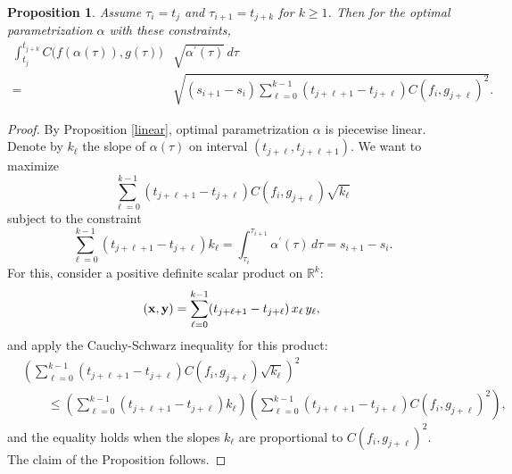 \documentclass[10pt,a4paper]{amsart}
\newcommand\R{\mathbb R}
\newtheorem{proposition}{Proposition}
\begin{document}
\begin{proposition}
\label{caseB}
Assume $\tau_i = t_j$ and $\tau_{i+1} = t_{j+k}$ for $k \geq 1$. Then for the optimal parametrization $\alpha$ with these constraints,
\begin{align*}
\int_{t_j}^{t_{j+k}}  C\big(f(\alpha(\tau)), g(\tau)\big) & \sqrt{\alpha^\prime(\tau)}  \,d\tau \\
= &\sqrt{(s_{i+1} - s_i) \sum_{\ell = 0}^{k-1} (t_{j+\ell+1} - t_{j+\ell}) C(f_i, g_{j+\ell})^2 }.
\end{align*}
\end{proposition}

\begin{proof}
By Proposition \ref{linear}, optimal parametrization $\alpha$ is piecewise linear. Denote by $k_\ell$ the slope of $\alpha(\tau)$ on interval $(t_{j+\ell}, t_{j+\ell+1})$. We want to maximize
\begin{equation*}
\sum_{\ell = 0}^{k-1} (t_{j+\ell+1} - t_{j+\ell}) C(f_i, g_{j+\ell}) \sqrt{k_\ell}
\end{equation*}
subject to the constraint
\begin{equation*}
\sum_{\ell = 0}^{k-1} (t_{j+\ell+1} - t_{j+\ell}) k_\ell = \int_{\tau_i}^{\tau_{i+1}} \alpha^\prime (\tau) \,d \tau = s_{i+1} - s_i.
\end{equation*}
For this, consider a positive definite scalar product on $\R^k$:
\begin{equation*}
({\bf x}, {\bf y}) = \sum_{\ell = 0}^{k-1} (t_{j+\ell+1} - t_{j+\ell}) \,x_\ell \,y_\ell,
\end{equation*}
and apply the Cauchy-Schwarz inequality for this product:
\begin{align*}
&\left( \sum_{\ell = 0}^{k-1}  (t_{j+\ell+1} - t_{j+\ell}) C(f_i, g_{j+\ell}) \sqrt{k_\ell} \right)^2 \\
&\quad\quad \leq \left( \sum_{\ell = 0}^{k-1} (t_{j+\ell+1} - t_{j+\ell}) k_\ell  \right) 
\left( \sum_{\ell = 0}^{k-1} (t_{j+\ell+1} - t_{j+\ell})  C(f_i, g_{j+\ell})^2 \right),
\end{align*}
and the equality holds when the slopes $k_\ell$ are proportional to $C(f_i, g_{j+\ell})^2$. The claim of the Proposition follows.
\end{proof}
\end{document}
